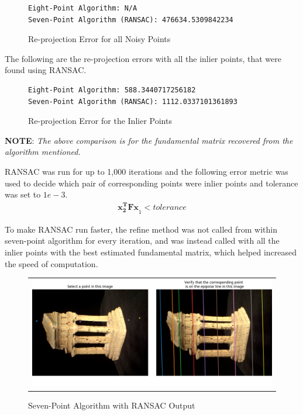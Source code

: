 \documentclass[a4paper]{article}
\begin{document}
\begin{figure}[!ht]
\centering
\begin{BVerbatim}
Eight-Point Algorithm: N/A
Seven-Point Algorithm (RANSAC): 476634.5309842234
\end{BVerbatim}
\caption{Re-projection Error for all Noisy Points}
\end{figure}

The following are the re-projection errors with all the inlier points, that were found using RANSAC.

\begin{figure}[!ht]
\centering
\begin{BVerbatim}
Eight-Point Algorithm: 588.3440717256182
Seven-Point Algorithm (RANSAC): 1112.0337101361893
\end{BVerbatim}
\caption{Re-projection Error for the Inlier Points}
\end{figure}

\textbf{NOTE}: \textit{The above comparison is for the fundamental matrix recovered from the algorithm mentioned.}

RANSAC was run for up to 1,000 iterations and the following error metric was used to decide which pair of corresponding points were inlier points and tolerance was set to $1e-3$.
\begin{gather}
    \boldsymbol{x _ { 2 } ^ { T } F x} _ { 1 } < tolerance
\end{gather}

To make RANSAC run faster, the refine method was not called from within seven-point algorithm for every iteration, and was instead called with all the inlier points with the best estimated fundamental matrix, which helped increased the speed of computation.

\begin{figure}[!ht]
\centering
\begin{tabular}{c}
{\includegraphics[width=\textwidth]{images/RANSAC.png}}
\end{tabular}
\caption{Seven-Point Algorithm with RANSAC Output}
\end{figure}
\end{document}
